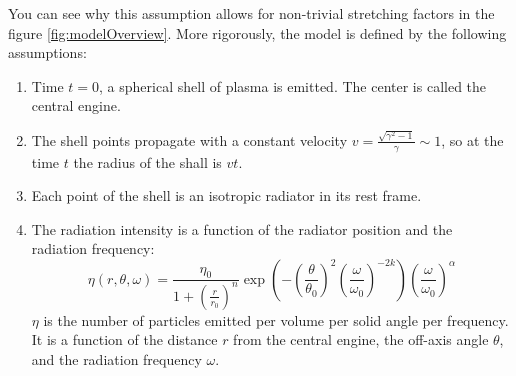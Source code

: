 \documentclass[11pt,a4paper]{article}
\begin{document}
You can see why this assumption allows for non-trivial stretching factors in the figure \ref{fig:modelOverview}.
More rigorously, the model is defined by the following assumptions:
\begin{enumerate}
	\item{
		Time $t = 0$, a spherical shell of plasma is emitted.
		The center is called the central engine.
	}
	\item{The shell points propagate with a constant velocity $v = \frac{\sqrt{\gamma^2-1}}{\gamma} \sim 1$, so at the time $t$ the radius of the shall is $v t$.}
	\item{Each point of the shell is an isotropic radiator in its rest frame.}
	\item{
		The radiation intensity is a function of the radiator position and the radiation frequency:
		\begin{equation*}
			\eta\left(r,\theta,\omega\right) = 
			\frac{\eta_0}{1 + \left(\frac{r}{r_0}\right)^n}
			\exp\left(
				-\left(\frac{\theta}{\theta_0}\right)^2
				\left(\frac{\omega}{\omega_0}\right)^{-2k}
			\right)
			\left(\frac{\omega}{\omega_0}\right)^\alpha
		\end{equation*}
		$\eta$ is the number of particles emitted per volume per solid angle per frequency.
		It is a function of the distance $r$ from the central engine, the off-axis angle $\theta$, and the radiation frequency $\omega$.
	}
\end{enumerate}
\end{document}
